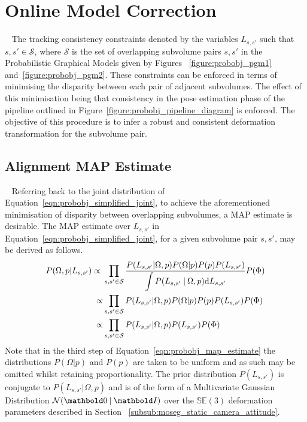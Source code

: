 \section{Online Model Correction}
~\label{sec:probobj_model_correction}
The tracking consistency constraints denoted by the variables \(L_{s, s'}\) such
that \(s, s' \in \mathcal{S}\), where \(\mathcal{S}\) is the set of overlapping
subvolume pairs \(s, s'\) in the Probabilistic Graphical Models given by Figures
~\ref{figure:probobj_pgm1} and~\ref{figure:probobj_pgm2}. These constraints can be 
enforced in terms of minimising the disparity between each pair of adjacent subvolumes. 
The effect of this minimisation being that consistency in the pose estimation phase of the
pipeline outlined in Figure~\ref{figure:probobj_pipeline_diagram} is enforced. The
objective of this procedure is to infer a robust and consistent deformation
transformation for the subvolume pair.

\subsection{Alignment MAP Estimate}
~\label{subsec:probobj_alignment_map}
Referring back to the joint distribution of Equation~\ref{eqn:probobj_simplified_joint}, 
to achieve the aforementioned minimisation of disparity between overlapping subvolumes, 
a MAP estimate is desirable. The MAP estimate over \(L_{s, s'}\) in 
Equation~\ref{eqn:probobj_simplified_joint}, for a given subvolume pair \(s, s'\), may be
derived as follows.
\begin{align}
  \label{eqn:probobj_map_estimate}
  P(\Omega, p | L_{s, s'}) \propto{}& \prod_{s, s' \in \mathcal{S}}
  \frac{P(L_{s, s'} | \Omega, p) 
  P(\Omega | p)P(p)P(L_{s, s'})}
  {\displaystyle\int P(L_{s, s'} \:\vert\: \Omega, p)
  {\mathrm d{L_{s, s'}}}} P(\Phi) \\
  \propto& \prod_{s, s' \in \mathcal{S}} P(L_{s, s'} | \Omega, p) P(\Omega | p)
  P(p)P(L_{s, s'})P(\Phi) \\
  \propto& \prod_{s, s' \in \mathcal{S}} P(L_{s, s'} | \Omega, p)P(L_{s, s'})
  P(\Phi)
\end{align}
Note that in the third step of Equation~\ref{eqn:probobj_map_estimate} the
distributions \(P(\Omega | p)\) and \(P(p)\) are taken to be uniform and as such may
be omitted whilst retaining proportionality. The prior distribution \(P(L_{s, s'})\) is
conjugate to \(P(L_{s, s'} | \Omega, p)\) and is of the form of a Multivariate
Gaussian Distribution \(\mathcal{N}(\bm{0} \given \bm{I})\) over the
\(\mathbb{SE}(3)\) deformation parameters described in Section 
~\ref{subsub:moseg_static_camera_attitude}. 

